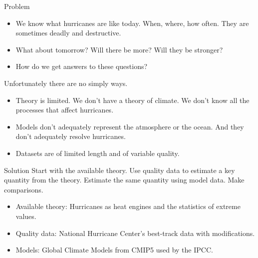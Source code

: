 \documentclass[handout]{beamer}
\begin{document}
\begin{frame}{Problem}
\begin{itemize}
\item We know what hurricanes are like today. When, where, how often. They are sometimes deadly and destructive.  
\item What about tomorrow? Will there be more? Will they be stronger?
\item How do we get answers to these questions?
\end{itemize}

Unfortunately there are no simply ways.
\begin{itemize}
\item \alert{Theory} is limited. We don't have a theory of climate. We don't know all the processes that affect hurricanes.
\item \alert{Models} don't adequately represent the atmosphere or the ocean. And they don't adequately resolve hurricanes.
\item \alert{Data}sets are of limited length and of variable quality. 
\end{itemize}
\end{frame}

\begin{frame}{Solution}
Start with the available theory. Use quality data to estimate a key quantity from the theory. Estimate the same quantity using model data. Make comparisons.
\begin{itemize}
\item Available theory: Hurricanes as heat engines and the statistics of extreme values.
\item Quality data: National Hurricane Center's best-track data with modifications.
\item Models: Global Climate Models from CMIP5 used by the IPCC.
\end{itemize}
\end{frame}
\end{document}
